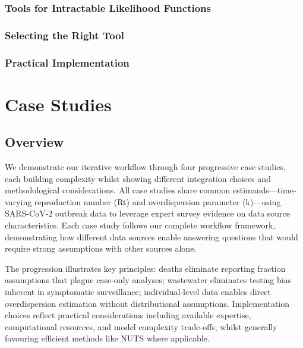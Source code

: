 \documentclass{article}
\begin{document}
\subsubsection{Tools for Intractable Likelihood Functions}

\subsubsection{Selecting the Right Tool}

\subsubsection{Practical Implementation}

\section{Case Studies}

\subsection{Overview}

We demonstrate our iterative workflow through four progressive case studies, each building complexity whilst showing different integration choices and methodological considerations.
All case studies share common estimands—time-varying reproduction number (Rt) and overdispersion parameter (k)—using SARS-CoV-2 outbreak data to leverage expert survey evidence on data source characteristics.
Each case study follows our complete workflow framework, demonstrating how different data sources enable answering questions that would require strong assumptions with other sources alone.

The progression illustrates key principles: deaths eliminate reporting fraction assumptions that plague case-only analyses; wastewater eliminates testing bias inherent in symptomatic surveillance; individual-level data enables direct overdispersion estimation without distributional assumptions.
Implementation choices reflect practical considerations including available expertise, computational resources, and model complexity trade-offs, whilst generally favouring efficient methods like NUTS where applicable.
\end{document}
